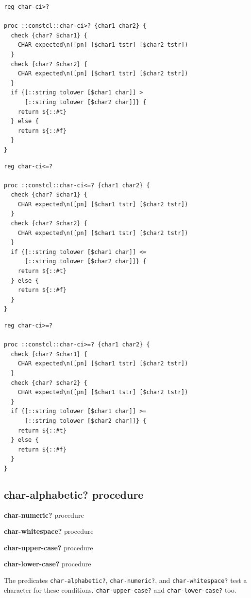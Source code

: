 \documentclass[twoside]{report}
\begin{document}
\begin{lstlisting}
reg char-ci>?

proc ::constcl::char-ci>? {char1 char2} {
  check {char? $char1} {
    CHAR expected\n([pn] [$char1 tstr] [$char2 tstr])
  }
  check {char? $char2} {
    CHAR expected\n([pn] [$char1 tstr] [$char2 tstr])
  }
  if {[::string tolower [$char1 char]] >
      [::string tolower [$char2 char]]} {
    return ${::#t}
  } else {
    return ${::#f}
  }
}
\end{lstlisting}

\begin{lstlisting}
reg char-ci<=?

proc ::constcl::char-ci<=? {char1 char2} {
  check {char? $char1} {
    CHAR expected\n([pn] [$char1 tstr] [$char2 tstr])
  }
  check {char? $char2} {
    CHAR expected\n([pn] [$char1 tstr] [$char2 tstr])
  }
  if {[::string tolower [$char1 char]] <=
      [::string tolower [$char2 char]]} {
    return ${::#t}
  } else {
    return ${::#f}
  }
}
\end{lstlisting}

\begin{lstlisting}
reg char-ci>=?

proc ::constcl::char-ci>=? {char1 char2} {
  check {char? $char1} {
    CHAR expected\n([pn] [$char1 tstr] [$char2 tstr])
  }
  check {char? $char2} {
    CHAR expected\n([pn] [$char1 tstr] [$char2 tstr])
  }
  if {[::string tolower [$char1 char]] >=
      [::string tolower [$char2 char]]} {
    return ${::#t}
  } else {
    return ${::#f}
  }
}
\end{lstlisting}

\subsection{char-alphabetic? procedure}
\label{charalphabetic-procedure}

\noindent \textbf{char-numeric?} procedure

\noindent \textbf{char-whitespace?} procedure

\noindent \textbf{char-upper-case?} procedure

\noindent \textbf{char-lower-case?} procedure

The predicates \texttt{char-alphabetic?}, \texttt{char-numeric?}, and \texttt{char-whitespace?} test a character for these conditions. \texttt{char-upper-case?} and \texttt{char-lower-case?} too.
\end{document}
